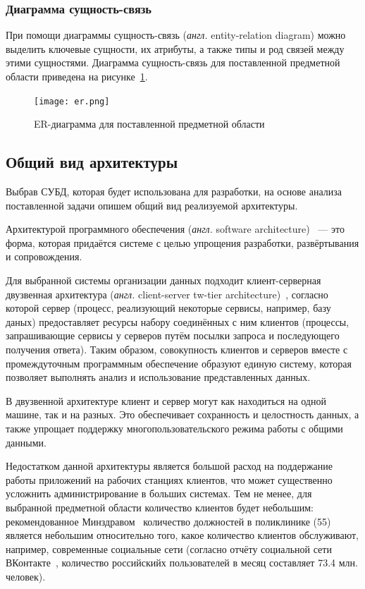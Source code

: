 \subsubsection{Диаграмма сущность-связь}

При помощи диаграммы сущность-связь (\textit{англ.} entity-relation diagram) можно выделить ключевые сущности, их атрибуты, а также типы и род связей между этими сущностями. 
Диаграмма сущность-связь для поставленной предметной области приведена на рисунке~\ref{fig:er}.


\begin{figure}[h!]
	\centering
	\captionsetup{justification=centering}
	\texttt{[image: er.png]}
	\caption{ER-диаграмма для поставленной предметной области}
	\label{fig:er}
\end{figure}


\subsection{Общий вид архитектуры}

Выбрав СУБД, которая будет использована для разработки, на основе анализа поставленной задачи опишем общий вид реализуемой архитектуры.

Архитектурой программного обеспечения (\textit{англ.} software architecture)~\cite{clean-architecture} --- это форма, которая придаётся системе с целью упрощения разработки, развёртывания и сопровождения. 

Для выбранной системы организации данных подходит клиент-серверная двузвенная архитектура (\textit{англ.} client-server tw-tier architecture)~\cite{client-server}, согласно которой сервер (процесс, реализующий некоторые сервисы, например, базу даных) предоставляет ресурсы набору соединённых с ним клиентов (процессы, запрашивающие сервисы у серверов путём посылки запроса и последующего получения ответа).
Таким образом, совокупность клиентов и серверов вместе с промеждуточным программным обеспечение образуют единую систему, которая позволяет выполнять анализ и использование представленных данных.

В двузвенной архитектуре клиент и сервер могут как находиться на одной машине, так и на разных. 
Это обеспечивает сохранность и целостность данных, а также  упрощает поддержку многопользовательского режима работы с общими данными.

Недостатком данной архитектуры является большой расход на поддержание работы приложений на рабочих станциях клиентов, что может существенно усложнить администрирование в больших системах.
Тем не менее, для выбранной предметной области количество клиентов будет небольшим: рекомендованное Минздравом~\cite{minsdrav-state} количество должностей в поликлинике (55) является небольшим относительно того, какое количество клиентов обслуживают, например, современные социальные сети (согласно отчёту социальной сети ВКонтакте~\cite{vk-results}, количество российскийх пользователей в месяц составляет 73.4 млн. человек).

